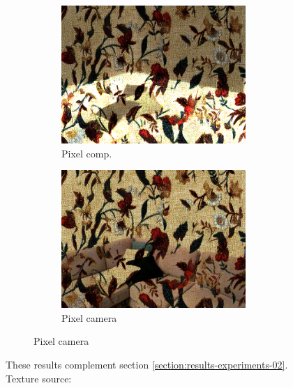 \begin{figure}[]
\begin{subfigure}{\textwidth}
\begin{subfigure}{0.24\textwidth}
            \includegraphics[width=\textwidth]{images/04-experiment02/sofa/flowers2/pixel_im.jpg}
            \caption*{Pixel comp.}
        \end{subfigure}
        \hfill
        \begin{subfigure}{0.24\textwidth}
            \centering
            \includegraphics[width=\textwidth]{images/04-experiment02/sofa/flowers2/pixel_proj.jpg}
            \caption*{Pixel camera}
        \end{subfigure}
    \end{subfigure}
    \caption{These results complement section \ref{section:results-experiments-02}. Texture source: \citet{Pixar128}}
    \label{fig:ex02-complete-sofa-flowers_flowers2}
\end{figure}

